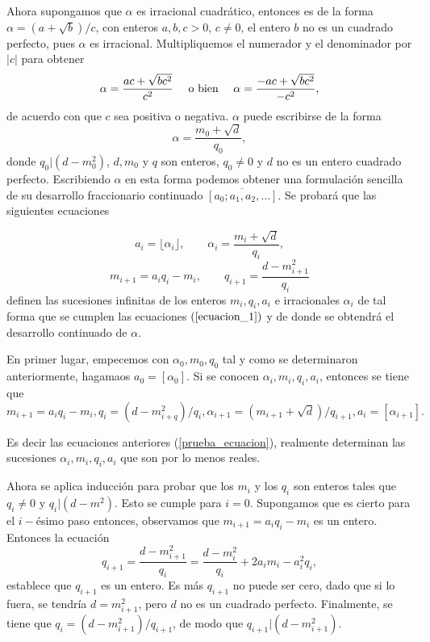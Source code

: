 \documentclass[11pt, article]{article}
\begin{document}
    Ahora supongamos que $\alpha$ es irracional cuadrático, entonces es de la forma $\alpha=(a+\sqrt{b})/c$, con enteros $a,b,c>0$, $c\not=0$, el entero $b$ no es un cuadrado perfecto, pues  $\alpha$ es irracional. Multipliquemos el numerador y el denominador por $|c|$ para obtener 
        \[
        \alpha = \dfrac{ac + \sqrt{bc^2}}{c^2} \quad \textnormal{ o bien } \quad \alpha=\dfrac{-ac+\sqrt{bc^2}}{-c^2},
        \]
    de acuerdo con que $c$ sea positiva o negativa. $\alpha$ puede escribirse de la forma
        \[
        \alpha = \dfrac{m_0+\sqrt{d}}{q_0},
        \]
    donde $q_0|(d-m_0^2)$, $d,m_0$ y $q$ son enteros, $q_0\not=0$ y $d$ no es un entero cuadrado perfecto. Escribiendo $\alpha$ en esta forma podemos obtener una formulación sencilla de su desarrollo fraccionario continuado $\overline{[a_0;a_1,a_2,\dots]}$. Se probará que las siguientes ecuaciones 

        \begin{equation}
        a_i= \lfloor \alpha_i \rfloor, \qquad \alpha_i=\dfrac{m_i+\sqrt{d}}{q_i}, \label{prueba_ecuacion}
        \end{equation}
        \[
        m_{i+1}=a_iq_i-m_i, \qquad q_{i+1}=\dfrac{d-m_{i+1}^2}{q_i}
        \] 
    definen las sucesiones infinitas de los enteros $m_i,q_i,a_i$ e irracionales $\alpha_i$ de tal forma que se cumplen las ecuaciones $(\ref{ecuacion_1})$ y de donde se obtendrá el desarrollo continuado de $\alpha$.

    En primer lugar, empecemos con $\alpha_0,m_0,q_0$ tal y como se determinaron anteriormente,  hagamaos $a_0=[\alpha_0]$. Si se conocen $\alpha_i,m_i,q_i,a_i$, entonces se tiene que 
        \[
         m_{i+1}=a_iq_i - m_i, q_i=(d-m_{i+q}^2)/q_i, \alpha_{i+1}=(m_{i+1} + \sqrt{d})/q_{i+1}, a_i=[\alpha_{i+1}].
         \]
    
    Es decir las ecuaciones anteriores (\ref{prueba_ecuacion}), realmente determinan las sucesiones $\alpha_i,m_i,q_i,a_i$ que son por lo menos reales.
    
    Ahora se aplica inducción para probar que los $m_i$ y los $q_i$ son enteros tales que $q_i\not=0$ y $q_i|(d-m^2)$. Esto se cumple para $i=0$. Supongamos que es cierto para el $i-$ésimo paso entonces, observamos que $m_{i+1}=a_iq_i-m_i$ es un entero. Entonces la ecuación 
         \[
        q_{i+1}=\dfrac{d-m_{i+1}^2}{q_i}=\dfrac{d-m_i^2}{q_i} + 2a_im_i-a_i^2q_i,
        \]
    establece que $q_{i+1}$ es un entero. Es más $q_{i+1}$ no puede ser cero, dado que si lo fuera, se tendría $d=m^2_{i+1}$, pero $d$ no es un cuadrado perfecto. Finalmente, se tiene que $q_i=(d-m_{i+1}^2)/q_{i+1}$, de modo que $q_{i+1}|(d-m_{i+1}^2)$.
    
\end{document}

